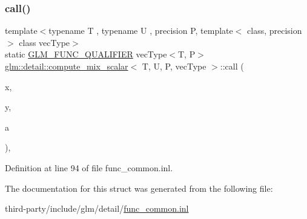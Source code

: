 \subsubsection{\texorpdfstring{call()}{call()}}
{\footnotesize\ttfamily template$<$typename T , typename U , precision P, template$<$ class, precision $>$ class vec\+Type$>$ \\
static \hyperlink{setup_8hpp_a33fdea6f91c5f834105f7415e2a64407}{G\+L\+M\+\_\+\+F\+U\+N\+C\+\_\+\+Q\+U\+A\+L\+I\+F\+I\+ER} vec\+Type$<$T, P$>$ \hyperlink{structglm_1_1detail_1_1compute__mix__scalar}{glm\+::detail\+::compute\+\_\+mix\+\_\+scalar}$<$ T, U, P, vec\+Type $>$\+::call (\begin{DoxyParamCaption}\item[{vec\+Type$<$ T, P $>$ const \&}]{x,  }\item[{vec\+Type$<$ T, P $>$ const \&}]{y,  }\item[{U const \&}]{a }\end{DoxyParamCaption})\hspace{0.3cm}{\ttfamily [inline]}, {\ttfamily [static]}}



Definition at line 94 of file func\+\_\+common.\+inl.



The documentation for this struct was generated from the following file\+:\begin{DoxyCompactItemize}
\item 
third-\/party/include/glm/detail/\hyperlink{func__common_8inl}{func\+\_\+common.\+inl}\end{DoxyCompactItemize}
